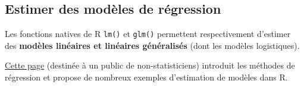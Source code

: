 \documentclass[12pt,twosided, notitlepage]{book}
\begin{document}
\subsection{Estimer des modèles de
régression}\label{estimer-des-modeles-de-regression}

Les fonctions natives de R \texttt{lm()} et \texttt{glm()} permettent
respectivement d'estimer des \textbf{modèles linéaires et linéaires
généralisés} (dont les modèles logistiques).

\href{http://teaching.slmc.fr/mqs2}{Cette page} (destinée à un public de
non-statisticiens) introduit les méthodes de régression et propose de
nombreux exemples d'estimation de modèles dans R.

\cleardoublepage
{}
{}
\listofcaspratique
\fancyhead{}

\printindex
\end{document}
